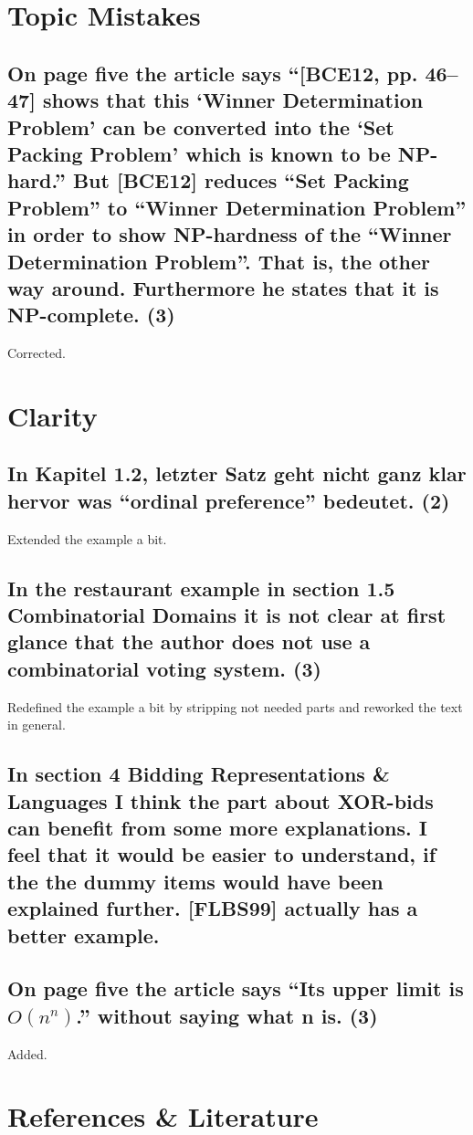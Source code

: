 \documentclass{"../../Datenanalyse/assignments/latex-brookesassignment/brookes-assignment"}
\begin{document}
\section{Topic Mistakes}
\subsection{On page five the article says ``[BCE12, pp. 46–47] shows that this `Winner Determination Problem' can be converted into the `Set Packing Problem' which is known to be NP-hard.'' But [BCE12] reduces ``Set Packing Problem'' to ``Winner Determination Problem'' in order to show NP-hardness of the ``Winner Determination Problem''. That is, the other way around. Furthermore he states that it is NP-complete. (3)}
Corrected.

\section{Clarity}
\subsection{In Kapitel 1.2, letzter Satz geht nicht ganz klar hervor was ``ordinal preference'' bedeutet. (2)}
Extended the example a bit.
\subsection{In the restaurant example in section 1.5 Combinatorial Domains it is not clear at first glance that the author does not use a combinatorial voting system. (3)}
Redefined the example a bit by stripping not needed parts and reworked the text in general.
\subsection{In section 4 Bidding Representations \& Languages I think the part about XOR-bids can benefit from some more explanations. I feel that it would be easier to understand, if the the dummy items would have been explained further. [FLBS99] actually has a better example.}
\subsection{On page five the article says ``Its upper limit is $O(n^n)$.'' without saying what n is. (3)}
Added.

\section{References \& Literature}
\end{document}
